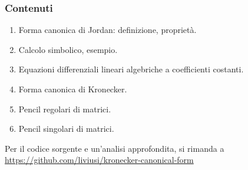 \begin{frame}
	\frametitle{Contenuti}
	\begin{enumerate}
		\item Forma canonica di Jordan: definizione, propriet\`a.
		\item Calcolo simbolico, esempio.
		\item Equazioni differenziali lineari algebriche a coefficienti costanti.
		\item Forma canonica di Kronecker.
		\item Pencil regolari di matrici.
		\item Pencil singolari di matrici.
	\end{enumerate}

	Per il codice sorgente e un'analisi approfondita, si rimanda a
	\url{https://github.com/liviusi/kronecker-canonical-form}
\end{frame}